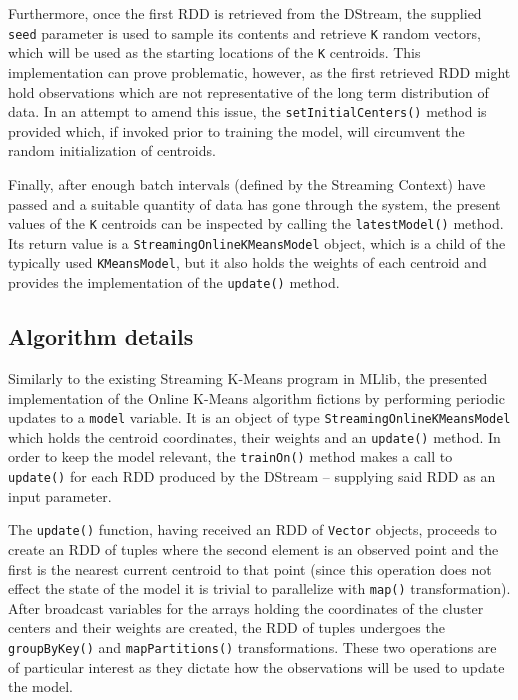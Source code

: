 \documentclass{l4proj}
\begin{document}
Furthermore, once the first RDD is retrieved from the DStream, the supplied \texttt{seed} parameter is used to sample its contents and retrieve \texttt{K} random vectors, which will be used as the starting locations of the \texttt{K} centroids. This implementation can prove problematic, however, as the first retrieved RDD might hold observations which are not representative of the long term distribution of data. In an attempt to amend this issue, the \texttt{setInitialCenters()} method is provided which, if invoked prior to training the model, will circumvent the random initialization of centroids.

Finally, after enough batch intervals (defined by the Streaming Context) have passed and a suitable quantity of data has gone through the system, the present values of the \texttt{K} centroids can be inspected by calling the \texttt{latestModel()} method. Its return value is a \texttt{StreamingOnlineKMeansModel} object, which is a child of the typically used \texttt{KMeansModel}, but it also holds the weights of each centroid and provides the implementation of the \texttt{update()} method.

\subsection{Algorithm details}

Similarly to the existing Streaming K-Means program in MLlib, the presented implementation of the Online K-Means algorithm fictions by performing periodic updates to a \texttt{model} variable. It is an object of type \texttt{StreamingOnlineKMeansModel} which holds the centroid coordinates, their weights and an \texttt{update()} method. In order to keep the model relevant, the \texttt{trainOn()} method makes a call to \texttt{update()} for each RDD produced by the DStream -- supplying said RDD as an input parameter.

The \texttt{update()} function, having received an RDD of \texttt{Vector} objects, proceeds to create an RDD of tuples where the second element is an observed point and the first is the nearest current centroid to that point (since this operation does not effect the state of the model it is trivial to parallelize with \texttt{map()} transformation). After broadcast variables for the arrays holding the coordinates of the cluster centers and their weights are created, the RDD of tuples undergoes the \texttt{groupByKey()} and \texttt{mapPartitions()} transformations. These two operations are of particular interest as they dictate how the observations will be used to update the model.
\end{document}
